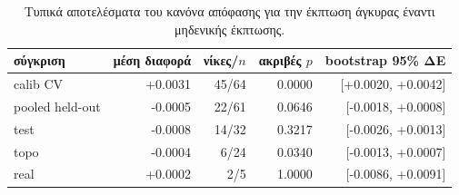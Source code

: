 \begin{table}[t]
\centering
\small
\caption{Τυπικά αποτελέσματα του κανόνα απόφασης για την έκπτωση άγκυρας έναντι μηδενικής έκπτωσης.}
\label{tab:v2anchor}
\begin{tabular}{@{}lrrrr@{}}\toprule
σύγκριση & μέση διαφορά & νίκες/$n$ & ακριβές $p$ & bootstrap 95\% ΔΕ \\
\midrule
calib CV & +0.0031 & 45/64 & 0.0000 & [+0.0020, +0.0042] \\
pooled held-out & -0.0005 & 22/61 & 0.0646 & [-0.0018, +0.0008] \\
test & -0.0008 & 14/32 & 0.3217 & [-0.0026, +0.0013] \\
topo & -0.0004 & 6/24 & 0.0340 & [-0.0013, +0.0007] \\
real & +0.0002 & 2/5 & 1.0000 & [-0.0086, +0.0091] \\
\bottomrule\end{tabular}
\end{table}
